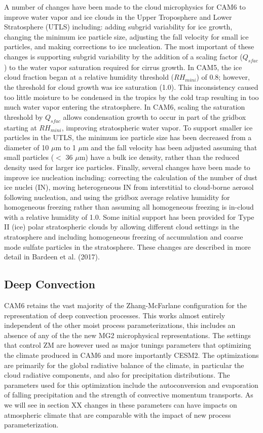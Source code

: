 A number of changes have been made to the cloud microphysics for CAM6 to improve water vapor and ice clouds in the Upper Troposphere and Lower Stratosphere (UTLS) including: adding subgrid variability for ice growth, changing the minimum ice particle size, adjusting the fall velocity for small ice particles, and making corrections to ice nucleation. The most important of these changes is supporting subgrid variability by the addition of a scaling factor ($Q_{sfac}$) to the water vapor saturation required for cirrus growth. In CAM5, the ice cloud fraction began at a relative humidity threshold ($RH_{mini}$) of 0.8; however, the threshold for cloud growth was ice saturation (1.0). This inconsistency caused too little moisture to be condensed in the tropics by the cold trap resulting in too much water vapor entering the stratosphere. In CAM6, scaling the saturation threshold by $Q_{sfac}$ allows condensation growth to occur in part of the gridbox starting at $RH_{mini}$, improving stratospheric water vapor. To support smaller ice particles in the UTLS, the minimum ice particle size has been decreased from a diameter of 10 $\mu$m to 1 $\mu$m and the fall velocity has been adjusted assuming that small particles ($<$ 36 $\mu$m) have a bulk ice density, rather than the reduced density used for larger ice particles. Finally, several changes have been made to improve ice nucleation including: correcting the calculation of the number of dust ice nuclei (IN), moving heterogeneous IN from interstitial to cloud-borne aerosol following nucleation, and using the gridbox average relative humidity for homogeneous freezing rather than assuming all homogeneous freezing is in-cloud with a relative humidity of 1.0. Some initial support has been provided for Type II (ice) polar stratospheric clouds by allowing different cloud settings in the stratosphere and including homogeneous freezing of accumulation and coarse mode sulfate particles in the stratosphere. These changes are described in more detail in Bardeen et al. (2017).

\subsection{Deep Convection}
CAM6 retains the vast majority of the Zhang-McFarlane \citep{ZM} configuration for the representation of deep convection processes. This works almost entirely independent of the other moist process parameterizations, this includes an absence of any of the the new MG2 \citep{gettelman15} microphysical representations. The settings that control ZM are however used as major tunings parameters that optimizing the climate produced in CAM6 and more importantly CESM2. The optimizations are primarily for the global radiative balance of the climate, in particular the cloud radiative components, and also for precipitation distributions. The parameters used for this optimization include the autoconversion and evaporation of falling precipitation and the strength of convective momentum transports. As we will see in section XX changes in these parameters can have impacts on atmospheric climate that are comparable with the impact of new process parameterization.



